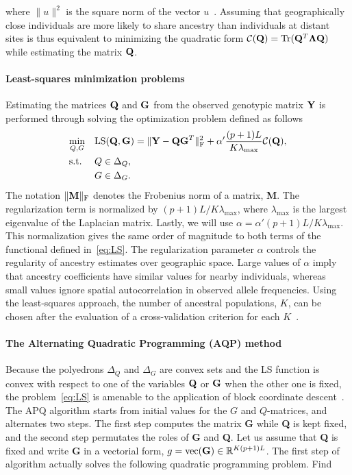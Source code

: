  \noindent  where $\|  u \|^2$ is the square norm of the vector $u$~\citep{DengCai2011}. Assuming that geographically close individuals are more likely to share ancestry than individuals at distant sites is thus equivalent to minimizing the quadratic form ${\cal C}({\bf Q}) ={\rm Tr} ({\bf Q}^T {\bf \Lambda} {\bf Q})$ while estimating the matrix ${\bf Q}$. 

\paragraph{Least-squares minimization problems} Estimating the matrices ${\bf Q}$ and ${\bf G }$ from the observed genotypic matrix ${\bf Y}$ is performed through solving the optimization problem defined as follows~\citep{Caye2016}
\begin{equation}
\begin{aligned}
& \underset{Q, G}{\text{min}}
& & {\rm LS}({\bf Q}, {\bf G}) =   \|  {\bf Y} - {\bf QG}^T \|^2_{\rm F} +  \alpha ' \frac{(p+1)L}{K \lambda_{\max}} {\cal C}({\bf Q}) , \\
& \text{s.t.} & &  Q \in \Delta_Q , \\
& & &  G \in \Delta_G . \\
\end{aligned}
\label{eq:LS}
\end{equation}
 \noindent The notation $\|  {\bf M}  \|_{\rm F}$ denotes the Frobenius norm of a matrix, {\bf M}. The regularization term is normalized by $(p+1)L/K \lambda_{\max}$, where $\lambda_{\max}$ is the largest eigenvalue of the Laplacian matrix. Lastly, we will use $\alpha = \alpha ' (p+1)L/K \lambda_{\max}$. This normalization gives the same order of magnitude to both terms of the functional defined in~\eqref{eq:LS}. The regularization parameter $\alpha$ controls the regularity of ancestry estimates over geographic space.  Large values of $\alpha$ imply that ancestry coefficients have similar values for nearby individuals, whereas small values ignore spatial autocorrelation in observed allele frequencies. Using the least-squares approach, the number of ancestral populations, $K$, can be chosen after the evaluation of a cross-validation criterion for each $K$~\citep{Alexander2011, Frichot2014, Frichot2015}.


\paragraph{The Alternating Quadratic Programming (AQP) method} Because the poly\-edrons $\Delta_Q$ and  $\Delta_G$ are convex sets and the LS function is convex with
respect to one of the variables ${\bf Q}$ or ${\bf G}$ when the other one is fixed, the problem~\eqref{eq:LS} is amenable to the application of block coordinate descent~\citep{Bertsekas1995}. The APQ algorithm starts from initial values for the $G$ and $Q$-matrices, and alternates two steps. The first step computes the matrix {\bf G} while  {\bf Q} is kept fixed, and the second step permutates the roles of {\bf G} and {\bf Q}.  Let us assume that {\bf Q} is fixed and write {\bf G} in a vectorial form, $g = {\rm vec({\bf G})} \in \mathbb{R}^{K(p + 1)L}$. The first step of algorithm actually solves the following quadratic programming problem. Find  

